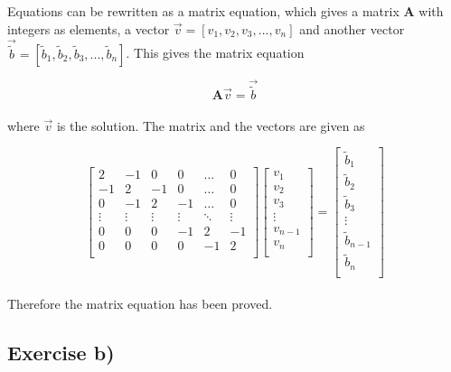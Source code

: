 \documentclass{article}
\begin{document}
  Equations can be rewritten as a matrix equation, which gives a matrix \textbf{A} with integers as elements, a vector $\vec{v} = [v_1, v_2, v_3, ... , v_n]$ and another vector $\vec{\tilde{b}} = [\tilde{b}_1, \tilde{b}_2, \tilde{b}_3, ... , \tilde{b}_n]$. This gives the matrix equation

  \begin{equation}
    \textbf{A} \vec{v} = \vec{\tilde{b}}  \label{eq:matrixeq}
  \end{equation} \\

  where $\vec{v}$ is the solution. The matrix and the vectors are given as

  \begin{equation} \label{eq:fullmatrixeq}
    \begin{bmatrix}
      2 & -1 & 0 & 0 & \dots & 0 \\
      -1 & 2 & -1 & 0 & \dots & 0 \\
      0 & -1 & 2 & -1 & \dots & 0 \\
      \vdots & \vdots & \vdots & \vdots & \ddots & \vdots \\
      0 & 0 & 0 & -1 & 2 & -1 \\
      0 & 0 & 0 & 0 & -1 & 2 \\
    \end{bmatrix}
    \begin{bmatrix}
      v_1 \\
      v_2 \\
      v_3 \\
      \vdots \\
      v_{n-1} \\
      v_n \\
    \end{bmatrix}
    =
    \begin{bmatrix}
      \tilde{b}_1 \\
      \tilde{b}_2 \\
      \tilde{b}_3 \\
      \vdots \\
      \tilde{b}_{n-1} \\
      \tilde{b}_n \\
    \end{bmatrix}
  \end{equation} \\

  Therefore the matrix equation has been proved. \\

\subsection{Exercise b)} \label{sec:Method b)}
\end{document}
